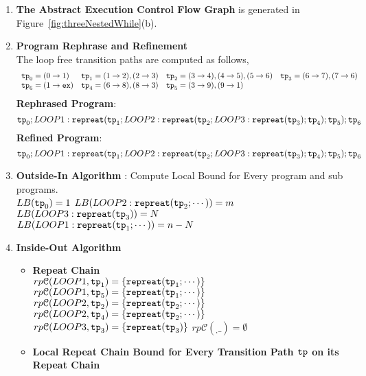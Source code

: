 \begin{enumerate}
    \item  \textbf{The Abstract Execution Control Flow Graph} is generated in Figure~\ref{fig:threeNestedWhile}(b).

    \item \textbf{Program Rephrase and Refinement}
    \\
    The loop free transition paths are computed as follows,
    \[
        \begin{array}{llll}
            \mathtt{tp}_0 = (0 \to 1)
            &
            \mathtt{tp}_1 = (1 \to 2), (2 \to 3)
            &           
            \mathtt{tp}_2 = (3 \to 4), (4 \to 5), (5 \to 6)
            &
            \mathtt{tp}_3 = (6 \to 7), (7 \to 6)
            \\
            \mathtt{tp}_6 = (1 \to \mathtt{ex})
            &
            \mathtt{tp}_4 = (6 \to 8), (8 \to 3)
            &
            \mathtt{tp}_5 = (3 \to 9), (9 \to 1)
        \end{array}
        \]
        \textbf{Rephrased Program}:
        \[
    \mathtt{tp}_0 ; LOOP1: \mathtt{repreat}(\mathtt{tp}_1; LOOP2: \mathtt{repreat}(\mathtt{tp}_2; LOOP3 : \mathtt{repreat}(\mathtt{tp}_3); \mathtt{tp}_4); \mathtt{tp}_5); \mathtt{tp}_6
    \]
    \textbf{Refined Program}:
    \[
    \mathtt{tp}_0 ; LOOP1: \mathtt{repreat}(\mathtt{tp}_1; LOOP2: \mathtt{repreat}(\mathtt{tp}_2; LOOP3 : \mathtt{repreat}(\mathtt{tp}_3); \mathtt{tp}_4); \mathtt{tp}_5); \mathtt{tp}_6
    \]
    \item \textbf{Outside-In Algorithm} : Compute Local Bound for Every program and sub programs.
    \\
$LB(\mathtt{tp}_0) = 1$
\quad
$LB(LOOP2: \mathtt{repreat}(\mathtt{tp}_2; \cdots)) = m $
\quad
$LB(LOOP3 : \mathtt{repreat}(\mathtt{tp}_3)) = N $
\\
$LB(LOOP1: \mathtt{repreat}(\mathtt{tp}_1; \cdots)) = n - N $
\item \textbf{Inside-Out Algorithm}
\begin{itemize}
    \item \textbf{Repeat Chain}
    \\
    $rp\mathcal{C}(LOOP1, \mathtt{tp}_1) = \{\mathtt{repreat}(\mathtt{tp}_1; \cdots)\}$ \quad
    $rp\mathcal{C}(LOOP1, \mathtt{tp}_5) = \{\mathtt{repreat}(\mathtt{tp}_1; \cdots)\}$ \\
    $rp\mathcal{C}(LOOP2, \mathtt{tp}_2) = \{\mathtt{repreat}(\mathtt{tp}_2; \cdots)\}$ \quad
    $rp\mathcal{C}(LOOP2, \mathtt{tp}_4) = \{\mathtt{repreat}(\mathtt{tp}_2; \cdots)\}$ \\
    $rp\mathcal{C}(LOOP3, \mathtt{tp}_3) = \{\mathtt{repreat}(\mathtt{tp}_3)\}$ \quad \quad
    $rp\mathcal{C}(_, \_) = \emptyset$ 
    \item \textbf{{Local Repeat Chain Bound} for Every Transition Path $\mathtt{tp}$ on its Repeat Chain}

\end{itemize}
\end{enumerate}
